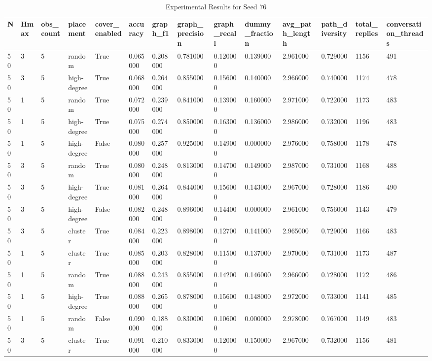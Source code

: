 \begin{table}
\caption{Experimental Results for Seed 76}
\label{tab:results_seed_76}
\begin{tabular}{llllllllllllll}
\toprule
N & Hmax & obs_count & placement & cover_enabled & accuracy & graph_f1 & graph_precision & graph_recall & dummy_fraction & avg_path_length & path_diversity & total_replies & conversation_threads \\
\midrule
50 & 3 & 5 & random & True & 0.065000 & 0.208000 & 0.781000 & 0.120000 & 0.139000 & 2.961000 & 0.729000 & 1156 & 491 \\
50 & 3 & 5 & high-degree & True & 0.068000 & 0.264000 & 0.855000 & 0.156000 & 0.140000 & 2.966000 & 0.740000 & 1174 & 478 \\
50 & 1 & 5 & random & True & 0.072000 & 0.239000 & 0.841000 & 0.139000 & 0.160000 & 2.971000 & 0.722000 & 1173 & 483 \\
50 & 1 & 5 & high-degree & True & 0.075000 & 0.274000 & 0.850000 & 0.163000 & 0.136000 & 2.986000 & 0.732000 & 1196 & 483 \\
50 & 1 & 5 & high-degree & False & 0.080000 & 0.257000 & 0.925000 & 0.149000 & 0.000000 & 2.976000 & 0.758000 & 1178 & 478 \\
50 & 3 & 5 & random & True & 0.080000 & 0.248000 & 0.813000 & 0.147000 & 0.149000 & 2.987000 & 0.731000 & 1168 & 488 \\
50 & 3 & 5 & high-degree & True & 0.081000 & 0.264000 & 0.844000 & 0.156000 & 0.143000 & 2.967000 & 0.728000 & 1186 & 490 \\
50 & 3 & 5 & high-degree & False & 0.082000 & 0.248000 & 0.896000 & 0.144000 & 0.000000 & 2.961000 & 0.756000 & 1143 & 479 \\
50 & 3 & 5 & cluster & True & 0.084000 & 0.223000 & 0.898000 & 0.127000 & 0.141000 & 2.965000 & 0.729000 & 1166 & 483 \\
50 & 1 & 5 & cluster & True & 0.085000 & 0.203000 & 0.828000 & 0.115000 & 0.137000 & 2.970000 & 0.731000 & 1173 & 487 \\
50 & 1 & 5 & random & True & 0.088000 & 0.243000 & 0.855000 & 0.142000 & 0.146000 & 2.966000 & 0.728000 & 1172 & 486 \\
50 & 1 & 5 & high-degree & True & 0.088000 & 0.265000 & 0.878000 & 0.156000 & 0.148000 & 2.972000 & 0.733000 & 1141 & 485 \\
50 & 1 & 5 & random & False & 0.090000 & 0.188000 & 0.830000 & 0.106000 & 0.000000 & 2.978000 & 0.767000 & 1149 & 483 \\
50 & 3 & 5 & cluster & True & 0.091000 & 0.210000 & 0.833000 & 0.120000 & 0.150000 & 2.967000 & 0.732000 & 1156 & 481 \\

\end{tabular}
\end{table}
